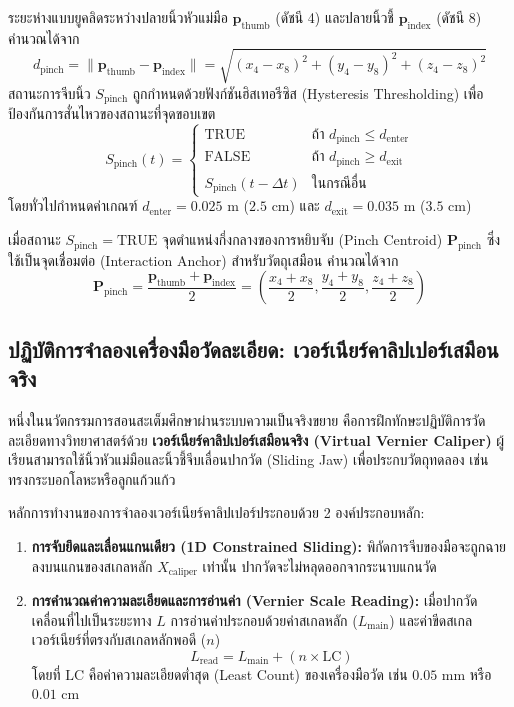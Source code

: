 ระยะห่างแบบยูคลิดระหว่างปลายนิ้วหัวแม่มือ $\mathbf{p}_{\text{thumb}}$ (ดัชนี 4) และปลายนิ้วชี้ $\mathbf{p}_{\text{index}}$ (ดัชนี 8) คำนวณได้จาก
\begin{equation}
d_{\text{pinch}} = \|\mathbf{p}_{\text{thumb}} - \mathbf{p}_{\text{index}}\| = \sqrt{(x_4 - x_8)^2 + (y_4 - y_8)^2 + (z_4 - z_8)^2}
\end{equation}
สถานะการจีบนิ้ว $S_{\text{pinch}}$ ถูกกำหนดด้วยฟังก์ชันฮิสเทอรีซิส (Hysteresis Thresholding) เพื่อป้องกันการสั่นไหวของสถานะที่จุดขอบเขต
\begin{equation}
S_{\text{pinch}}(t) = 
\begin{cases} 
\text{TRUE} & \text{ถ้า } d_{\text{pinch}} \le d_{\text{enter}} \\
\text{FALSE} & \text{ถ้า } d_{\text{pinch}} \ge d_{\text{exit}} \\
S_{\text{pinch}}(t-\Delta t) & \text{ในกรณีอื่น}
\end{cases}
\end{equation}
โดยทั่วไปกำหนดค่าเกณฑ์ $d_{\text{enter}} = 0.025\text{ m}$ ($2.5\text{ cm}$) และ $d_{\text{exit}} = 0.035\text{ m}$ ($3.5\text{ cm}$)

เมื่อสถานะ $S_{\text{pinch}} = \text{TRUE}$ จุดตำแหน่งกึ่งกลางของการหยิบจับ (Pinch Centroid) $\mathbf{P}_{\text{pinch}}$ ซึ่งใช้เป็นจุดเชื่อมต่อ (Interaction Anchor) สำหรับวัตถุเสมือน คำนวณได้จาก
\begin{equation}
\mathbf{P}_{\text{pinch}} = \frac{\mathbf{p}_{\text{thumb}} + \mathbf{p}_{\text{index}}}{2} = \left(\frac{x_4 + x_8}{2}, \frac{y_4 + y_8}{2}, \frac{z_4 + z_8}{2}\right)
\end{equation}

\subsection{ปฏิบัติการจำลองเครื่องมือวัดละเอียด: เวอร์เนียร์คาลิปเปอร์เสมือนจริง}

หนึ่งในนวัตกรรมการสอนสะเต็มศึกษาผ่านระบบความเป็นจริงขยาย คือการฝึกทักษะปฏิบัติการวัดละเอียดทางวิทยาศาสตร์ด้วย \textbf{เวอร์เนียร์คาลิปเปอร์เสมือนจริง (Virtual Vernier Caliper)} ผู้เรียนสามารถใช้นิ้วหัวแม่มือและนิ้วชี้จีบเลื่อนปากวัด (Sliding Jaw) เพื่อประกบวัตถุทดลอง เช่น ทรงกระบอกโลหะหรือลูกแก้วแก้ว

หลักการทำงานของการจำลองเวอร์เนียร์คาลิปเปอร์ประกอบด้วย 2 องค์ประกอบหลัก:
\begin{enumerate}
    \item \textbf{การจับยึดและเลื่อนแกนเดียว (1D Constrained Sliding):} พิกัดการจีบของมือจะถูกฉายลงบนแกนของสเกลหลัก $X_{\text{caliper}}$ เท่านั้น ปากวัดจะไม่หลุดออกจากระนาบแกนวัด
    \item \textbf{การคำนวณค่าความละเอียดและการอ่านค่า (Vernier Scale Reading):} เมื่อปากวัดเคลื่อนที่ไปเป็นระยะทาง $L$ การอ่านค่าประกอบด้วยค่าสเกลหลัก ($L_{\text{main}}$) และค่าขีดสเกลเวอร์เนียร์ที่ตรงกับสเกลหลักพอดี ($n$)
    \begin{equation}
    L_{\text{read}} = L_{\text{main}} + (n \times \text{LC})
    \end{equation}
    โดยที่ $\text{LC}$ คือค่าความละเอียดต่ำสุด (Least Count) ของเครื่องมือวัด เช่น $0.05\text{ mm}$ หรือ $0.01\text{ cm}$
\end{enumerate}

